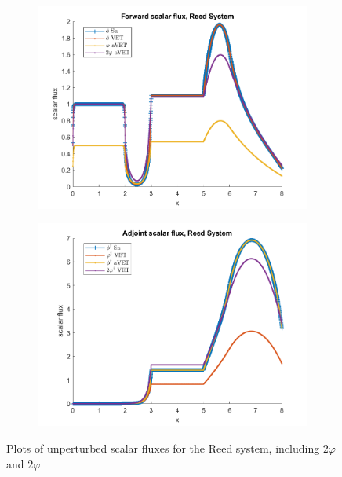 \documentclass[12pt]{report}
\begin{document}
\begin{appendices}
\begin{figure}[H]
\centering
\begin{subfigure}{.5\textwidth}
  \centering
  \includegraphics[width=.98\linewidth]{figures2/7phi2.png}
\end{subfigure}%
\begin{subfigure}{.5\textwidth}
  \centering
  \includegraphics[width=.98\linewidth]{figures2/7phia2.png}
\end{subfigure}
\caption{Plots of unperturbed scalar fluxes for the Reed system, including $2\varphi$ and $2\varphi^\dag$ }
\label{fig:2Flux3}
\end{figure}



\end{appendices}

%
\end{document}
